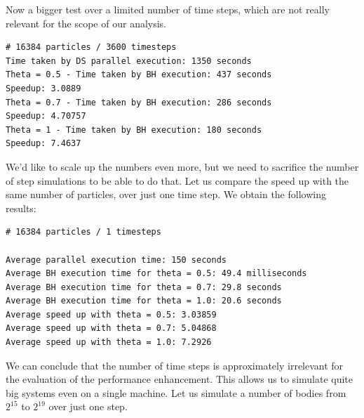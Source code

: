 \documentclass{article}
\begin{document}
Now a bigger test over a limited number of time steps, which are not really relevant for the scope of our analysis.
\begin{boxA}
\begin{verbatim}
# 16384 particles / 3600 timesteps 
Time taken by DS parallel execution: 1350 seconds
Theta = 0.5 - Time taken by BH execution: 437 seconds
Speedup: 3.0889
Theta = 0.7 - Time taken by BH execution: 286 seconds
Speedup: 4.70757
Theta = 1 - Time taken by BH execution: 180 seconds
Speedup: 7.4637
\end{verbatim}
\end{boxA}

We'd like to scale up the numbers even more, but we need to sacrifice the number of step simulations to be able to do that. Let us compare the speed up with the same number of particles, over just one time step. We obtain the following results: \\
\begin{boxA}
\begin{verbatim}
# 16384 particles / 1 timesteps

Average parallel execution time: 150 seconds
Average BH execution time for theta = 0.5: 49.4 milliseconds
Average BH execution time for theta = 0.7: 29.8 seconds
Average BH execution time for theta = 1.0: 20.6 seconds
Average speed up with theta = 0.5: 3.03859
Average speed up with theta = 0.7: 5.04868
Average speed up with theta = 1.0: 7.2926
\end{verbatim}
\end{boxA}
\noindent We can conclude that the number of time steps is approximately irrelevant for the evaluation of the performance enhancement. This allows us to simulate quite big systems even on a single machine. Let us simulate a number of bodies from $2^{15}$ to $2^{19}$ over just one step. 
\end{document}
